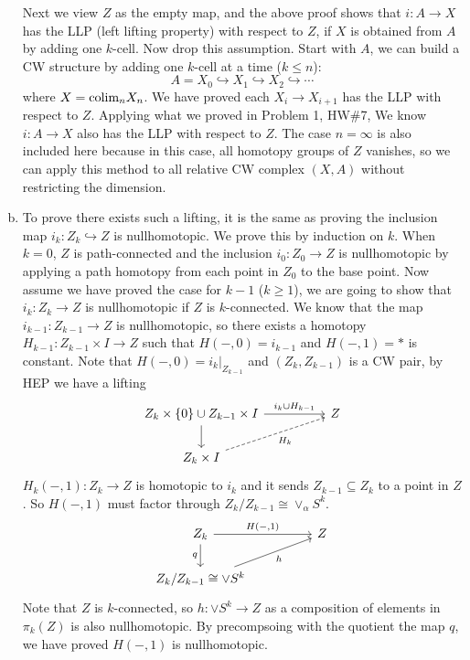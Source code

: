 \documentclass[letterpaper, 12pt]{article}
\begin{document}
\begin{solution}
\begin{enumerate}[(a)]
Next we view \(Z\) as the empty map, and the above proof shows that \(i:A\rightarrow X\) has the LLP (left lifting property) with respect to \(Z\), if \(X\) is obtained from \(A\) by adding one \(k\)-cell. Now drop this assumption. Start with \(A\), we can build a CW structure by adding one \(k\)-cell at a time (\(k\leq n\)): 
\[A=X_0\hookrightarrow X_1\hookrightarrow X_2\hookrightarrow \cdots\]
where \(X=\text{colim}_n X_n\). We have proved each \(X_i\rightarrow X_{i+1}\) has the LLP with respect to \(Z\). Applying what we proved in Problem 1, HW\#7, We know \(i:A\rightarrow X\) also has the LLP with respect to \(Z\). The case \(n=\infty\) is also included here because in this case, all homotopy groups of \(Z\) vanishes, so we can apply this method 
to all relative CW complex \((X,A)\) without restricting the dimension. 
\item To prove there exists such a lifting, it is the same as proving the inclusion map \(i_k:Z_k\hookrightarrow Z\) is nullhomotopic. We prove this by induction on \(k\). When \(k=0\), \(Z\) is path-connected and the inclusion \(i_0:Z_0\rightarrow Z\) is nullhomotopic by applying a path homotopy from each point 
in \(Z_0\) to the base point. Now assume we have proved the case for \(k-1\) (\(k\geq 1\)), we are going to show that \(i_k:Z_k\rightarrow Z\) is nullhomotopic if \(Z\) is \(k\)-connected. We know that the map \(i_{k-1}:Z_{k-1}\rightarrow Z\) is nullhomotopic, so there exists a homotopy 
\(H_{k-1}:Z_{k-1}\times I\rightarrow Z\) such that \(H(-,0)=i_{k-1}\) and \(H(-,1)=*\) is constant. Note that \(H(-,0)=i_k|_{Z_{k-1}}\) and \((Z_k,Z_{k-1})\) is a CW pair, by HEP we have a lifting 
\[\begin{tikzcd}
	{Z_k\times\left\{0\right\}\cup Z_{k-1}\times I} && Z \\
	{Z_k\times I}
	\arrow["{i_k\cup H_{k-1}}", from=1-1, to=1-3]
	\arrow[from=1-1, to=2-1]
	\arrow["{H_k}"', dashed, from=2-1, to=1-3]
\end{tikzcd}\]
\(H_k(-,1):Z_k\rightarrow Z\) is homotopic to \(i_k\) and it sends \(Z_{k-1}\subseteq Z_k\) to a point in \(Z\). So \(H(-,1)\) must factor through \(Z_k/Z_{k-1}\cong \vee_\alpha S^k\).
\[\begin{tikzcd}
	{Z_k} && Z \\
	{Z_k/Z_{k-1}\cong \vee S^k}
	\arrow["{H(-,1)}", from=1-1, to=1-3]
	\arrow["q"', from=1-1, to=2-1]
	\arrow["h"', from=2-1, to=1-3]
\end{tikzcd}\]
Note that \(Z\) is \(k\)-connected, so \(h:\vee S^k\rightarrow Z\) as a composition of elements in \(\pi_k(Z)\) is also nullhomotopic. By precompsoing with the quotient the map \(q\), we have proved \(H(-,1)\) is nullhomotopic. 


\end{enumerate}
\end{solution}
\end{document}
